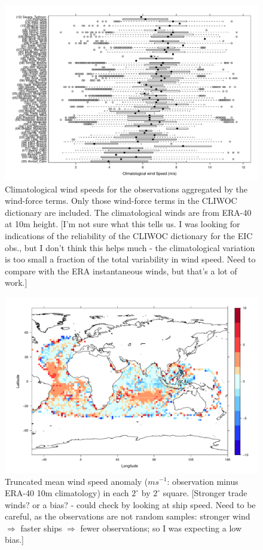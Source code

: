 \documentclass[a4paper,11pt]{article}
\begin{document}
\begin{figure}
\begin{center}
\includegraphics[angle=0, width=1.0\textwidth]{../winds/climate_v_descriptor}
\caption{Climatological wind speeds for the observations aggregated by the wind-force terms. Only those wind-force terms in the CLIWOC dictionary are included. The climatological winds are from ERA-40 at 10m height. [I'm not sure what this tells us. I was looking for indications of the reliability of the CLIWOC dictionary for the EIC obs., but I don't think this helps much - the climatological variation is too small a fraction of the total variability in wind speed. Need to compare with the ERA instantaneous winds, but that's a lot of work.]}
\label{climate_v_descriptor}
\end{center}
\end{figure}

\begin{figure}
\begin{center}
\includegraphics[angle=0, width=1.0\textwidth]{../anomaly_map/ws_anomaly}
\caption{Truncated mean wind speed anomaly ($ms^{-1}$: observation minus ERA-40 10m climatology) in each $2^\circ$ by $2^\circ$ square. [Stronger trade winds? or a bias? - could check by looking at ship speed. Need to be careful, as the observations are not random samples: stronger wind $\Rightarrow$ faster ships $\Rightarrow$ fewer observations; so I was expecting a low bias.] }
\label{ws_anomaly}
\end{center}
\end{figure}
\end{document}
